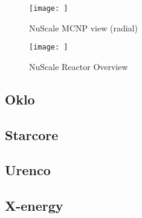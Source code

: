\documentclass[10pt,a4paper]{article}
\begin{document}
\begin{figure}[hbtp]
\centering
\texttt{[image: ]}
\caption{NuScale MCNP view (radial)}
\end{figure}

\begin{figure}[hbtp]
\centering
\texttt{[image: ]}
\caption{NuScale Reactor Overview}
\end{figure}

\subsection{Oklo}

\subsection{Starcore}

\subsection{Urenco}

\subsection{X-energy}
\end{document}
